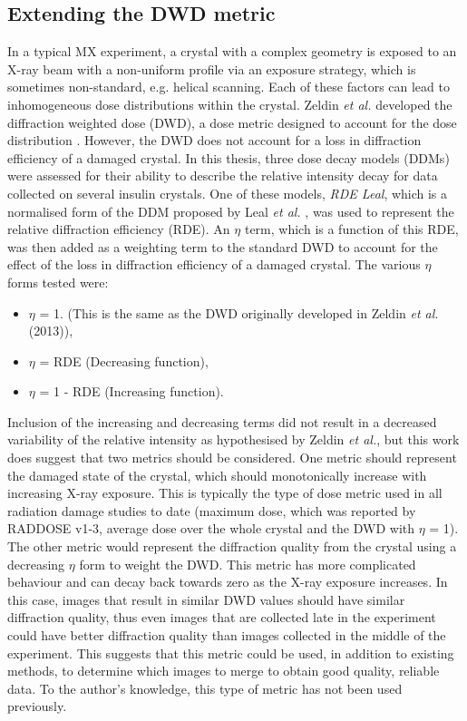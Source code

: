 \subsection{Extending the DWD metric}
\label{sub:Extending the DWD metric}
In a typical MX experiment, a crystal with a complex geometry is exposed to an X-ray beam with a non-uniform profile via an exposure strategy, which is sometimes non-standard, e.g. helical scanning.
Each of these factors can lead to inhomogeneous dose distributions within the crystal.
Zeldin \textit{et al.} developed the diffraction weighted dose (DWD), a dose metric designed to account for the dose distribution \cite{zeldin2013dwd}.
However, the DWD does not account for a loss in diffraction efficiency of a damaged crystal.
In this thesis, three dose decay models  (DDMs) were assessed for their ability to describe the relative intensity decay for data collected on several insulin crystals.
One of these models, \textit{RDE Leal}, which is a normalised form of the DDM proposed by Leal \textit{et al.} \cite{leal2012}, was used to represent the relative diffraction efficiency (RDE).
An $\eta$ term, which is a function of this RDE, was then added as a weighting term to the standard DWD to account for the effect of the loss in diffraction efficiency of a damaged crystal.
The various $\eta$ forms tested were:
\begin{itemize}
    \item $\eta$ = 1. (This is the same as the DWD originally developed in Zeldin \textit{et al.} (2013)),
    \item $\eta$ = RDE (Decreasing function),
    \item $\eta$ = 1 - RDE (Increasing function).
\end{itemize}
Inclusion of the increasing and decreasing terms did not result in a decreased variability of the relative intensity as hypothesised by Zeldin \textit{et al.}, but this work does suggest that two metrics should be considered.
One metric should represent the damaged state of the crystal, which should monotonically increase with increasing X-ray exposure.
This is typically the type of dose metric used in all radiation damage studies to date (maximum dose, which was reported by RADDOSE v1-3, average dose over the whole crystal and the DWD with $\eta$ = 1).
The other metric would represent the diffraction quality from the crystal using a decreasing $\eta$ form to weight the DWD.
This metric has more complicated behaviour and can decay back towards zero as the X-ray exposure increases.
In this case, images that result in similar DWD values should have similar diffraction quality, thus even images that are collected late in the experiment could have better diffraction quality than images collected in the middle of the experiment.
This suggests that this metric could be used, in addition to existing methods, to determine which images to merge to obtain good quality, reliable data.
To the author's knowledge, this type of metric has not been used previously.

